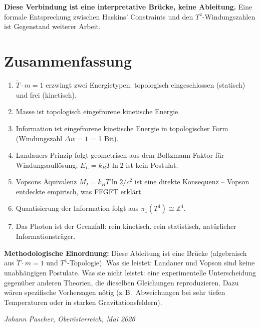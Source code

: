 \textbf{Diese Verbindung ist eine interpretative Brücke, keine Ableitung.}
Eine formale Entsprechung zwischen Haskins' Constraints und
den \(T^4\)-Windungszahlen ist Gegenstand weiterer Arbeit.

\section{Zusammenfassung}

\begin{enumerate}
  \item \(\tilde{T} \cdot m = 1\) erzwingt zwei Energietypen:
        topologisch eingeschlossen (statisch) und frei (kinetisch).
  \item Masse ist topologisch eingefrorene kinetische Energie.
  \item Information ist eingefrorene kinetische Energie
        in topologischer Form (Windungszahl \(\Delta w = 1\) = 1 Bit).
  \item Landauers Prinzip folgt geometrisch aus dem Boltzmann-Faktor
        für Windungsauflösung; \(E_L = k_BT\ln 2\) ist kein Postulat.
  \item Vopsons Äquivalenz \(M_I = k_BT\ln2/c^2\) ist eine direkte
        Konsequenz -- Vopson entdeckte empirisch, was FFGFT erklärt.
  \item Quantisierung der Information folgt aus \(\pi_1(T^4)\cong\mathbb{Z}^4\).
  \item Das Photon ist der Grenzfall: rein kinetisch, rein statistisch,
        natürlicher Informationsträger.
\end{enumerate}

\bigskip
\noindent
\textbf{Methodologische Einordnung:}
Diese Ableitung ist eine Brücke (algebraisch aus \(\tilde{T}\cdot m=1\)
und \(T^4\)-Topologie).
Was sie leistet: Landauer und Vopson sind keine unabhängigen Postulate.
Was sie nicht leistet: eine experimentelle Unterscheidung gegenüber
anderen Theorien, die dieselben Gleichungen reproduzieren.
Dazu wären spezifische Vorhersagen nötig (z.\,B.\ Abweichungen bei
sehr tiefen Temperaturen oder in starken Gravitationsfeldern).

\bigskip
\begin{flushright}
\textit{Johann Pascher, Oberösterreich, Mai 2026}
\end{flushright}

